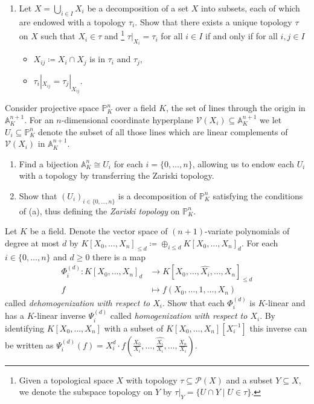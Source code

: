 \documentclass{exercises}
\begin{document}
\begin{exercise}
  \begin{enumerate}
    \item Let $X=⋃_{i ∈ I}X_i$ be a decomposition of a set $X$ into subsets, each of which are endowed with a topology $τ_i$.
      Show that there exists a unique topology $τ$ on $X$ such that $X_i ∈ τ$ and%
      \footnote{Given a topological space $X$ with topology $τ⊆𝒫(X)$ and a subset $Y⊆X$, we denote the subspace topology on $Y$ by $τ|_Y=\{U∩Y \mid U ∈ τ\}$.}
      $τ|_{X_i} = τ_i$ for all $i ∈ I$ if and only if for all $i,j ∈ I$
      \begin{itemize}
        \item $X_{ij}\coloneqq X_i ∩ X_j$ is in $τ_i$ and $τ_j$,
        \item $τ_i|_{X_{ij}} = τ_j|_{X_{ij}}$.
      \end{itemize}
  \end{enumerate}
  Consider projective space $ℙ^n_K$ over a field $K$, the set of lines through the origin in $𝔸^{n+1}_K$.
  For an $n$-dimensional coordinate hyperplane $𝒱(X_i) ⊆ 𝔸^{n+1}_K$ we let $U_i ⊆ ℙ^n_K$ denote the subset of all those lines which are linear complements of $𝒱(X_i)$ in $𝔸^{n+1}_K$.
  \begin{enumerate}[start=2]
    \item Find a bijection $𝔸^n_K ≅ U_i$ for each $i = \{0,\dots,n\}$, allowing us to endow each $U_i$ with a topology by transferring the Zariski topology.
    \item Show that $(U_i)_{i ∈ \{0,\dots,n\}}$ is a decomposition of $ℙ^n_K$ satisfying the conditions of (a), thus defining the \emph{Zariski topology} on $ℙ^n_K$.
  \end{enumerate}
\end{exercise}

\begin{exercise}
  Let $K$ be a field.
  Denote the vector space of $(n+1)$-variate polynomials of degree at most $d$ by $K[X_0,\dots,X_n]_{≤d}\coloneqq ⊕_{i ≤ d}K[X_0,\dots,X_n]_d$.
  For each $i ∈ \{0,\dots,n\}$ and $d ≥ 0$ there is a map
  \begin{align*}
    Φ_i^{(d)} : K[X_0,\dots,X_n]_d & \longrightarrow K[X_0,\dots,\widehat{X_i},\dots,X_n]_{≤d}\\
    f & \longmapsto f(X_0,\dots,1,\dots,X_n)
  \end{align*}
  called \emph{dehomogenization with respect to $X_i$}.
    Show that each $Φ^{(d)}_i$ is $K$-linear and has a $K$-linear inverse $Ψ_i^{(d)}$ called \emph{homogenization with respect to $X_i$}.
      By identifying $K[X_0,\dots,X_n]$ with a subset of $K[X_0,\dots,X_n][X_i^{-1}]$ this inverse can be written as $Ψ^{(d)}_i(f)=X_i^d ⋅ f(\tfrac{X_0}{X_i},\dots,\widehat{\tfrac{X_i}{X_i}},\dots,\tfrac{X_n}{X_i})$.
\end{exercise}
\end{document}
